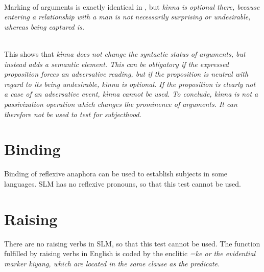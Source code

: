 \\

Marking of arguments is exactly identical in , but  \em kìnna \em is optional there, because entering a relationship with a man is not necessarily surprising or undesirable, whereas being captured is.

 \\


This shows that \em kìnna \em does not change the syntactic status of arguments, but instead adds a semantic element. This can be obligatory if the expressed proposition forces an adversative reading, but if the proposition is neutral with regard to its being undesirable, \em kìnna \em is optional. If the proposition is clearly not a case of an adversative event, \em kìnna \em cannot be used. To conclude, \em kìnna \em is not a passivization operation which changes the prominence of arguments. It can therefore not be used to test for subjecthood.

\section{Binding}\label{sec:grel:Binding}
Binding of reflexive anaphora can be used to establish subjects in some languages. SLM has no reflexive pronouns, so that this test cannot be used.

\section{Raising}\label{sec:grel:Raising}
There are no raising verbs in SLM, so that this test cannot be used. The function fulfilled by raising verbs in English is coded by the enclitic \em =ke \em or the evidential marker \em kiyang\em, which are located in the same clause as the predicate.

